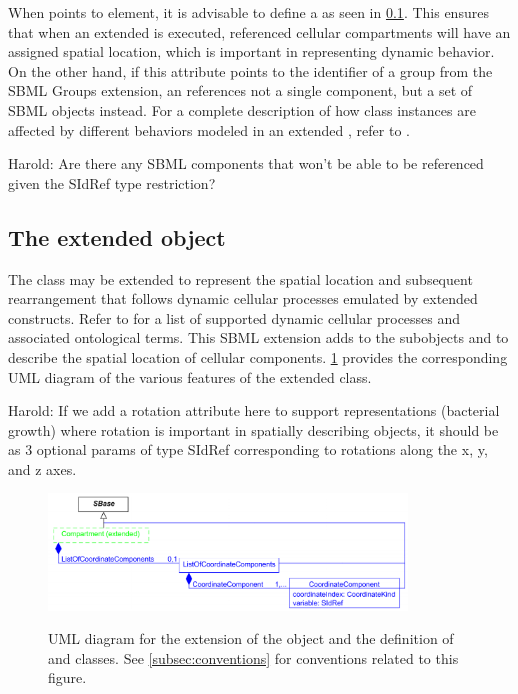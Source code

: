 When  points to \Compartment element, it is advisable to define a \ListOfCoordinateComponents as seen in \ref{subsec:extCompartment}. This ensures that when an extended \Event is executed, referenced cellular compartments will have an assigned spatial location, which is important in representing dynamic behavior. On the other hand, if this attribute points to the identifier of a group from the SBML Groups extension, an \Element references not a single component, but a set of SBML objects instead. For a complete description of how \Element class instances are affected by different behaviors modeled in an extended \Event, refer to .

{\color{red} Harold: \notice Are there any SBML components that won't be able to be referenced given the SIdRef type restriction?}

\subsection{The extended  object}
\label{subsec:extCompartment}

The \Compartment class may be extended to represent the spatial location and subsequent rearrangement that follows dynamic cellular processes emulated by extended \Event constructs. Refer to  for a list of supported dynamic cellular processes and associated ontological terms. This SBML extension adds to \Compartment the subobjects \ListOfCoordinateComponents and \CoordinateComponent to describe the spatial location of cellular components. \ref{fig:UMLExtendedCompartment} provides the corresponding UML diagram of the various features of the extended \Compartment class. 

{\color{red} Harold: \notice If we add a rotation attribute here to support representations (bacterial growth) where rotation is important in spatially describing objects, it should be as 3 optional params of type SIdRef corresponding to rotations along the x, y, and z axes.}

\begin{figure}[tbhp]
	\centering
	\includegraphics[width=0.85\textwidth]{images/UMLExtendedCompartment.pdf}\\
	\caption{UML diagram for the extension of the \Compartment object and the definition of \ListOfCoordinateComponents and \CoordinateComponent classes. See \ref{subsec:conventions} for conventions related to this figure.} \label{fig:UMLExtendedCompartment}
\end{figure}

